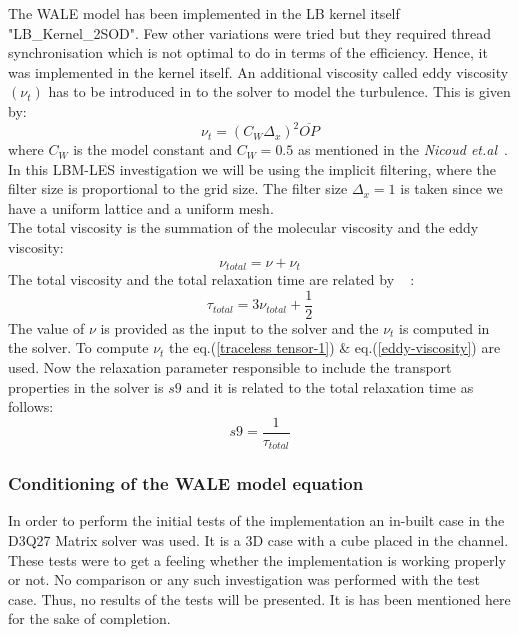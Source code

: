 The WALE model has been implemented in the LB kernel itself "LB\_Kernel\_2SOD". Few other variations were tried but they required thread synchronisation which is not optimal to do in terms of the efficiency. Hence, it was implemented in the kernel itself. An additional viscosity called eddy viscosity $\left(\nu_t\right)$ has to be introduced in to the solver to model the turbulence. This is given by:
%
\begin{equation}
\label{Eddy viscosity}
\nu_t = \left(C_W \Delta_x \right)^2 \overline{OP}
\end{equation}
%
where $C_W$ is the model constant and $C_W = 0.5 $ as mentioned in the \emph{Nicoud et.al}~\cite{nicoud:WALE}. In this LBM-LES investigation we will be using the implicit filtering, where the filter size is proportional to the grid size. The filter size $\Delta_x = 1$ is taken since we have a uniform lattice and a uniform mesh. \\
The total viscosity is the summation of the molecular viscosity and the eddy viscosity:
%
\begin{equation}
\label{Total viscosity}
\nu_{total} = \nu + \nu_t
\end{equation}
%
The total viscosity and the total relaxation time are related by ~\cite{weickert:LES} :
%
\begin{equation}
\label{Total rel. time}
\tau_{total} = 3\nu_{total} + \frac{1}{2}
\end{equation}
%
The value of $\nu$ is provided as the input to the solver and the $\nu_t$ is computed in the solver. To compute $\nu_t$ the eq.(\ref{traceless tensor-1}) \& eq.(\ref{eddy-viscosity}) are used. Now the relaxation parameter responsible to include the transport properties in the solver is $s9$ and it is related to the total relaxation time as follows:
%
\begin{equation}
\label{s9}
s9 = \frac{1}{\tau_{total}}
\end{equation}
%
\subsubsection{Conditioning of the WALE model equation}

In order to perform the initial tests of the implementation an in-built case in the D3Q27 Matrix solver was used. It is a 3D case with a cube placed in the channel. These tests were to get a feeling whether the implementation is working properly or not. No comparison or any such investigation was performed with the test case. Thus, no results of the tests will be presented. It is has been mentioned here for the sake of completion.

